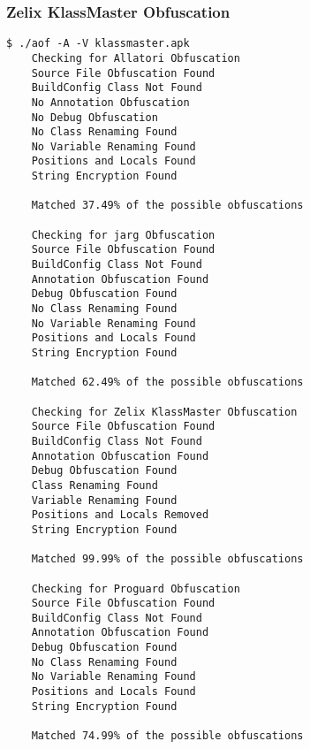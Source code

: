 \subsubsection{Zelix KlassMaster Obfuscation}
\label{app:zkmob}
\begin{lstlisting}
$ ./aof -A -V klassmaster.apk
    Checking for Allatori Obfuscation
	Source File Obfuscation Found
	BuildConfig Class Not Found
	No Annotation Obfuscation
	No Debug Obfuscation
	No Class Renaming Found
	No Variable Renaming Found
	Positions and Locals Found
	String Encryption Found

	Matched 37.49% of the possible obfuscations

    Checking for jarg Obfuscation
	Source File Obfuscation Found
	BuildConfig Class Not Found
	Annotation Obfuscation Found
	Debug Obfuscation Found
	No Class Renaming Found
	No Variable Renaming Found
	Positions and Locals Found
	String Encryption Found

	Matched 62.49% of the possible obfuscations

    Checking for Zelix KlassMaster Obfuscation
	Source File Obfuscation Found
	BuildConfig Class Not Found
	Annotation Obfuscation Found
	Debug Obfuscation Found
	Class Renaming Found
	Variable Renaming Found
	Positions and Locals Removed
	String Encryption Found

	Matched 99.99% of the possible obfuscations

    Checking for Proguard Obfuscation
	Source File Obfuscation Found
	BuildConfig Class Not Found
	Annotation Obfuscation Found
	Debug Obfuscation Found
	No Class Renaming Found
	No Variable Renaming Found
	Positions and Locals Found
	String Encryption Found

	Matched 74.99% of the possible obfuscations
\end{lstlisting}
\newpage

